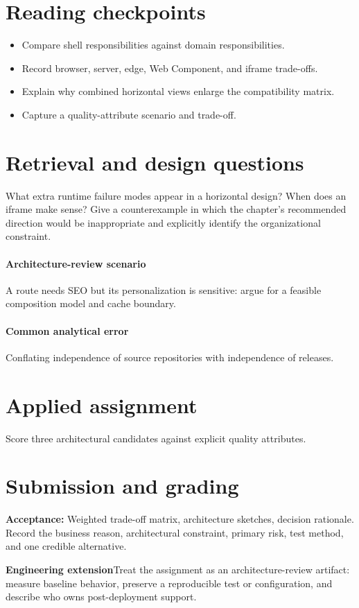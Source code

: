 \documentclass[11pt,letterpaper,oneside]{report}
\newcommand{\criterion}[1]{\textbf{Acceptance:} #1}
\begin{document}
\section{Reading checkpoints}
\begin{itemize}\item Compare shell responsibilities against domain responsibilities.
\item Record browser, server, edge, Web Component, and iframe trade-offs.
\item Explain why combined horizontal views enlarge the compatibility matrix.
\item Capture a quality-attribute scenario and trade-off.
\end{itemize}
\section{Retrieval and design questions}
What extra runtime failure modes appear in a horizontal design? When does an iframe make sense? Give a counterexample in which the chapter's recommended direction would be inappropriate and explicitly identify the organizational constraint.
\paragraph{Architecture-review scenario} A route needs SEO but its personalization is sensitive: argue for a feasible composition model and cache boundary.
\paragraph{Common analytical error} Conflating independence of source repositories with independence of releases.
\section{Applied assignment}
Score three architectural candidates against explicit quality attributes.
\section{Submission and grading}
\criterion{Weighted trade-off matrix, architecture sketches, decision rationale. Record the business reason, architectural constraint, primary risk, test method, and one credible alternative.}
\begin{engineerbox}\textbf{Engineering extension}\newline Treat the assignment as an architecture-review artifact: measure baseline behavior, preserve a reproducible test or configuration, and describe who owns post-deployment support.\end{engineerbox}
\end{document}
